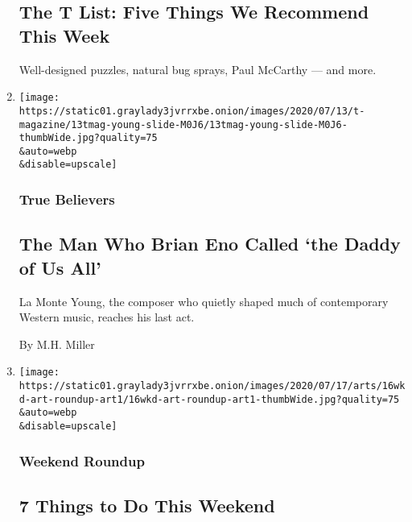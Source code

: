 \begin{enumerate}
  \hypertarget{the-t-list-five-things-we-recommend-this-week-2}{%
  \subsection{The T List: Five Things We Recommend This
  Week}\label{the-t-list-five-things-we-recommend-this-week-2}}

  Well-designed puzzles, natural bug sprays, Paul McCarthy --- and more.
\item
  \href{/2020/07/22/t-magazine/la-monte-young.html}{}

  \texttt{[image: https://static01.graylady3jvrrxbe.onion/images/2020/07/13/t-magazine/13tmag-young-slide-M0J6/13tmag-young-slide-M0J6-thumbWide.jpg?quality=75\\\&auto=webp\\\&disable=upscale]}

  \hypertarget{true-believers}{%
  \subsubsection{True Believers}\label{true-believers}}

  \hypertarget{the-man-who-brian-eno-called-the-daddy-of-us-all}{%
  \subsection{The Man Who Brian Eno Called `the Daddy of Us
  All'}\label{the-man-who-brian-eno-called-the-daddy-of-us-all}}

  La Monte Young, the composer who quietly shaped much of contemporary
  Western music, reaches his last act.

  By M.H. Miller
\item
  \href{/2020/07/16/arts/things-to-do-weekend-coronavirus.html}{}

  \texttt{[image: https://static01.graylady3jvrrxbe.onion/images/2020/07/17/arts/16wkd-art-roundup-art1/16wkd-art-roundup-art1-thumbWide.jpg?quality=75\\\&auto=webp\\\&disable=upscale]}

  \hypertarget{weekend-roundup}{%
  \subsubsection{Weekend Roundup}\label{weekend-roundup}}

  \hypertarget{7-things-to-do-this-weekend}{%
  \subsection{7 Things to Do This
  Weekend}\label{7-things-to-do-this-weekend}}


\end{enumerate}
